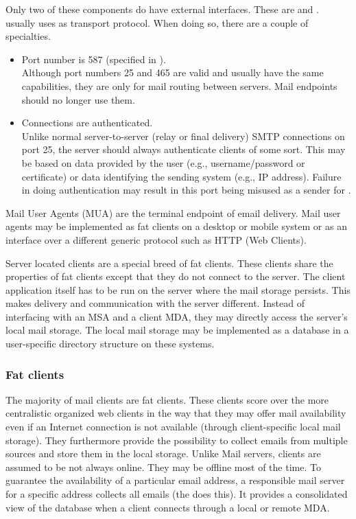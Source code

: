 Only two of these components do have external interfaces. These are  and .  usually uses  as transport protocol. When doing so, there are a couple of specialties. 
\begin{itemize}
	\item Port number is 587 (specified in \cite{rfc4409}).\\
	Although port numbers 25 and 465 are valid and usually have the same capabilities, they are only for mail routing between servers. Mail endpoints should no longer use them.
	\item Connections are authenticated.\\
	Unlike normal server-to-server (relay or final delivery) SMTP connections on port 25, the server should always authenticate clients of some sort. This may be based on data provided by the user (e.g., username/password or certificate) or data identifying the sending system (e.g., IP address)\cite{rfc4409}. Failure in doing authentication may result in this port being misused as a sender for .
\end{itemize}

Mail User Agents (MUA) are the terminal endpoint of email delivery. Mail user agents may be implemented as fat clients on a desktop or mobile system or as an interface over a different generic protocol such as HTTP (Web Clients). 

Server located clients are a special breed of fat clients. These clients share the properties of fat clients except that they do not connect to the server. The client application itself has to be run on the server where the mail storage persists. This makes delivery and communication with the server different. Instead of interfacing with an MSA and a client MDA, they may directly access the server's local mail storage. The local mail storage may be implemented as a database in a user-specific directory structure on these systems.

\subsubsection*{Fat clients}
The majority of mail clients are fat clients. These clients score over the more centralistic organized web clients in the way that they may offer mail availability even if an Internet connection is not available (through client-specific local mail storage). They furthermore provide the possibility to collect emails from multiple sources and store them in the local storage. Unlike Mail servers, clients are assumed to be not always online. They may be offline most of the time. To guarantee the availability of a particular email address, a responsible mail server for a specific address collects all emails (the  does this). It provides a consolidated view of the database when a client connects through a local or remote MDA.

